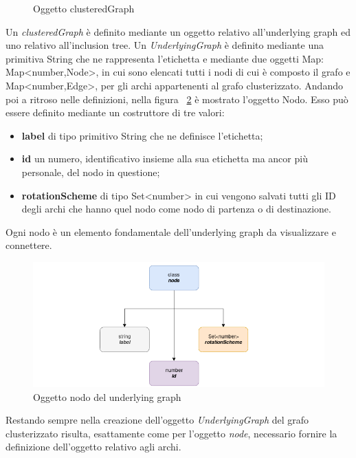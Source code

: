 {\begin{figure}[!htb]
\begin{center}
	\end{center}
	\caption{Oggetto clusteredGraph\label{fig:cgraphClass}}
\end{figure}
Un \textit{clusteredGraph} è definito mediante un oggetto relativo all'underlying graph ed uno relativo all'inclusion tree.
Un \textit{UnderlyingGraph} è definito mediante una primitiva String che ne rappresenta l'etichetta e mediante due oggetti Map: Map<number,Node>, in cui sono elencati tutti i nodi di cui è composto il grafo e Map<number,Edge>, per gli archi appartenenti al grafo clusterizzato. 
Andando poi a ritroso nelle definizioni, nella figura \figurename~\ref{fig:nodeClass} è mostrato l'oggetto Nodo. Esso può essere definito mediante un costruttore di tre valori:
\begin{itemize}
	\item \textbf{label} di tipo primitivo String che ne definisce l'etichetta;
	\item \textbf{id} un numero, identificativo insieme alla sua etichetta ma ancor più personale, del nodo in questione;
	\item \textbf{rotationScheme} di tipo Set<number> in cui vengono salvati tutti gli ID degli archi che hanno quel nodo come nodo di partenza o di destinazione.
\end{itemize}
Ogni nodo è un elemento fondamentale dell'underlying graph da visualizzare e connettere.
\begin{figure}[!htb]
	\begin{center}
		\includegraphics[width=1 \linewidth]{figure/nodeClass}
	\end{center}
	\caption{Oggetto nodo del underlying graph\label{fig:nodeClass}}
\end{figure}
Restando sempre nella creazione dell'oggetto \textit{UnderlyingGraph} del grafo clusterizzato risulta, esattamente come per l'oggetto \textit{node}, necessario fornire la definizione dell'oggetto relativo agli archi.
}
